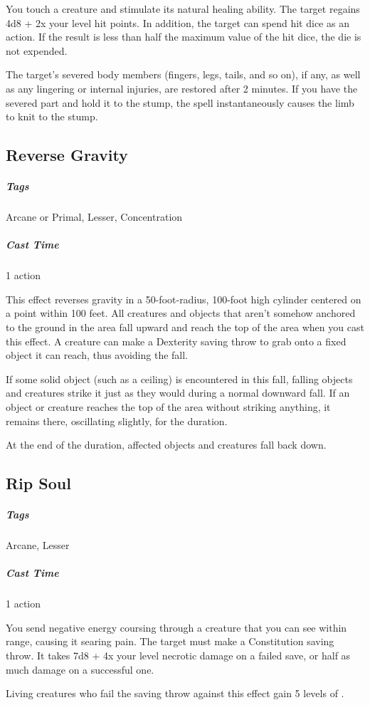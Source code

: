 You touch a creature and stimulate its natural healing ability. The target regains 4d8 + 2x your level hit points. In addition, the target can spend hit dice as an action. If the result is less than half the maximum value of the hit dice, the die is not expended.

The target’s severed body members (fingers, legs, tails, and so on), if any, as well as any lingering or internal injuries, are restored after 2 minutes. If you have the severed part and hold it to the stump, the spell instantaneously causes the limb to knit to the stump.

\subsection{Reverse Gravity\label{spell:reverse-gravity}}
\subparagraph*{Tags} Arcane or Primal, Lesser, Concentration
\subparagraph*{Cast Time} 1 action

This effect reverses gravity in a 50-foot-radius, 100-foot high cylinder centered on a point within 100 feet. All creatures and objects that aren’t somehow anchored to the ground in the area fall upward and reach the top of the area when you cast this effect. A creature can make a Dexterity saving throw to grab onto a fixed object it can reach, thus avoiding the fall.

If some solid object (such as a ceiling) is encountered in this fall, falling objects and creatures strike it just as they would during a normal downward fall. If an object or creature reaches the top of the area without striking anything, it remains there, oscillating slightly, for the duration.

At the end of the duration, affected objects and creatures fall back down.

\subsection{Rip Soul\label{spell:rip-soul}}
\subparagraph*{Tags} Arcane, Lesser
\subparagraph*{Cast Time} 1 action

You send negative energy coursing through a creature that you can see within range, causing it searing pain. The target must make a Constitution saving throw. It takes 7d8 + 4x your level necrotic damage on a failed save, or half as much damage on a successful one.

Living creatures who fail the saving throw against this effect gain 5 levels of .

